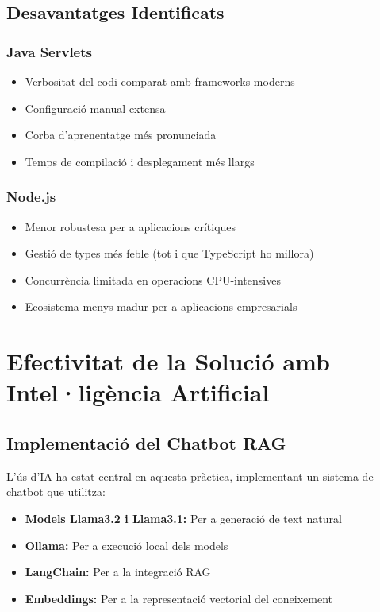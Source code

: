 \documentclass[12pt,a4paper]{article}
\begin{document}
\subsection{Desavantatges Identificats}

\subsubsection{Java Servlets}

\begin{itemize}
    \item Verbositat del codi comparat amb frameworks moderns
    \item Configuració manual extensa
    \item Corba d'aprenentatge més pronunciada
    \item Temps de compilació i desplegament més llargs
\end{itemize}

\subsubsection{Node.js}

\begin{itemize}
    \item Menor robustesa per a aplicacions crítiques
    \item Gestió de types més feble (tot i que TypeScript ho millora)
    \item Concurrència limitada en operacions CPU-intensives
    \item Ecosistema menys madur per a aplicacions empresarials
\end{itemize}

\section{Efectivitat de la Solució amb Intel·ligència Artificial}

\subsection{Implementació del Chatbot RAG}

L'ús d'IA ha estat central en aquesta pràctica, implementant un sistema de chatbot que utilitza:

\begin{itemize}
    \item \textbf{Models Llama3.2 i Llama3.1:} Per a generació de text natural
    \item \textbf{Ollama:} Per a execució local dels models
    \item \textbf{LangChain:} Per a la integració RAG
    \item \textbf{Embeddings:} Per a la representació vectorial del coneixement
\end{itemize}
\end{document}

